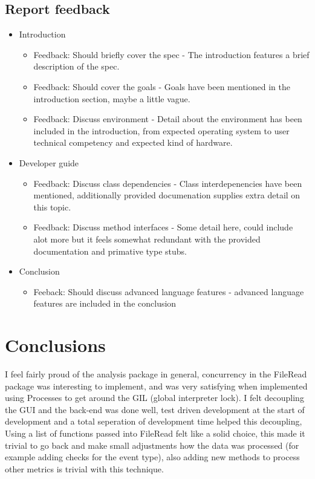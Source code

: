 \documentclass[11pt]{article}
\begin{document}
\subsection{Report feedback}
\begin{itemize}
    \item Introduction
        \begin{itemize}
            \item Feedback: Should briefly cover the spec - The introduction features a brief description of the spec.
            \item Feedback: Should cover the goals - Goals have been mentioned in the introduction section, maybe a little vague.
            \item Feedback: Discuss environment - Detail about the environment has been included in the introduction, from expected operating system to user technical competency and expected kind of hardware.
        \end{itemize}
    \item Developer guide
        \begin{itemize}
            \item Feedback: Discuss class dependencies - Class interdepenencies have been mentioned, additionally provided documenation supplies extra detail on this topic.
            \item Feedback: Discuss method interfaces - Some detail here, could include alot more but it feels somewhat redundant with the provided documentation and primative type stubs.
        \end{itemize}
    \item Conclusion
        \begin{itemize}
            \item Feeback: Should discuss advanced language features - advanced language features are included in the conclusion
        \end{itemize}
\end{itemize}


\section{Conclusions}


I feel fairly proud of the analysis package in general, concurrency in the FileRead package was interesting to implement, and was very satisfying when implemented using Processes to get around the GIL (global interpreter lock). 
I felt decoupling the GUI and the back-end was done well, test driven development at the start of development and a total seperation of development time helped this decoupling, 
Using a list of functions passed into FileRead felt like a solid choice, this made it trivial to go back and make small adjustments how the data was processed (for example adding checks for the event type), also adding new methods to process other metrics is trivial with this technique.
\end{document}

